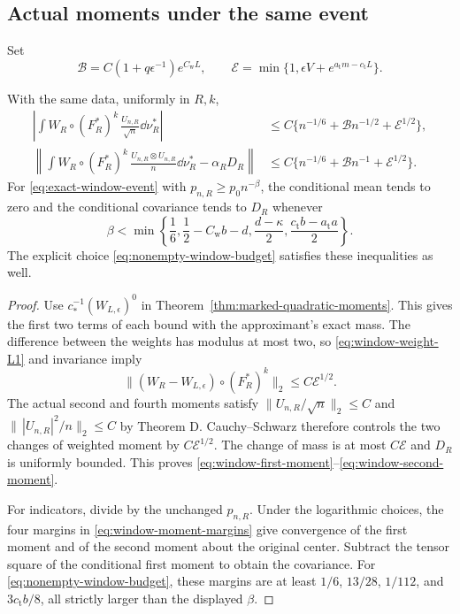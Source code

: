 \subsection{Actual moments under the same event}
Set
\[
 \mathcal B=C(1+q\epsilon^{-1})e^{C_{\mathrm w}L},\qquad
 \mathcal E=\min\{1,\epsilon V+e^{a_{\mathrm t}m-c_{\mathrm t}L}\}.
\]
\begin{theorem}
\label{thm:window-weighted-moments}
With the same data, uniformly in $R,k$,
\begin{align}
 \left|\int W_R\circ(F_R^*)^k\,\frac{U_{n,R}}{\sqrt n}\dd\nu_R^*\right|
  &\le C\{n^{-1/6}+\mathcal B n^{-1/2}+\mathcal E^{1/2}\},
       \label{eq:window-first-moment}\\
 \left\|\int W_R\circ(F_R^*)^k\,
           \frac{U_{n,R}\otimes U_{n,R}}n\dd\nu_R^*
                           -\alpha_R D_R\right\|
  &\le C\{n^{-1/6}+\mathcal B n^{-1}+\mathcal E^{1/2}\}.
       \label{eq:window-second-moment}
\end{align}
For \eqref{eq:exact-window-event} with $p_{n,R}\ge p_0n^{-\beta}$,
the conditional mean tends to zero and the conditional covariance
tends to $D_R$ whenever
\begin{equation}\label{eq:window-moment-margins}
 \beta<\min\left\{\frac16,\frac12-C_{\mathrm w}b-d,
             \frac{d-\kappa}{2},
             \frac{c_{\mathrm t}b-a_{\mathrm t}a}{2}\right\}.
\end{equation}
The explicit choice \eqref{eq:nonempty-window-budget} satisfies these
inequalities as well.
\end{theorem}
\begin{proof}
Use $c_*^{-1}(W_{L,\epsilon})^0$ in
Theorem~\ref{thm:marked-quadratic-moments}. This gives the first two
terms of each bound with the approximant's exact mass.
The difference between the weights has modulus at most two, so
\eqref{eq:window-weight-L1} and invariance imply
\[
 \| (W_R-W_{L,\epsilon})\circ(F_R^*)^k\|_2
                               \le C\mathcal E^{1/2}.
\]
The actual second and fourth moments satisfy
$\|U_{n,R}/\sqrt n\|_2\le C$ and
$\|\,|U_{n,R}|^2/n\|_2\le C$ by Theorem D.
Cauchy--Schwarz therefore controls the two changes of weighted moment
by $C\mathcal E^{1/2}$. The change of mass is at most $C\mathcal E$
and $D_R$ is uniformly bounded. This proves
\eqref{eq:window-first-moment}--\eqref{eq:window-second-moment}.

For indicators, divide by the unchanged $p_{n,R}$. Under the
logarithmic choices, the four margins in
\eqref{eq:window-moment-margins} give convergence of the first moment
and of the second moment about the original center. Subtract the tensor
square of the conditional first moment to obtain the covariance.
For \eqref{eq:nonempty-window-budget}, these margins are at least
$1/6$, $13/28$, $1/112$, and $3c_{\mathrm t}b/8$, all strictly larger
than the displayed $\beta$.
\end{proof}

